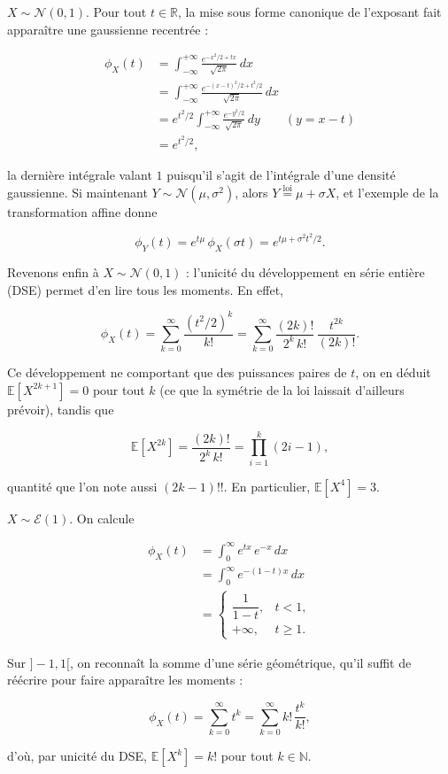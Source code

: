 \begin{exemple}
$X \sim \mathcal{N}(0, 1)$. Pour tout $t \in \mathbb{R}$, la mise sous forme canonique de l'exposant fait apparaître une gaussienne recentrée :

\begin{align*}
\phi_X(t) &= \int_{-\infty}^{+\infty} \frac{e^{-x^2/2 + tx}}{\sqrt{2\pi}}\, dx \\
&= \int_{-\infty}^{+\infty} \frac{e^{-(x - t)^2/2 + t^2/2}}{\sqrt{2\pi}}\, dx \\
&= e^{t^2/2} \int_{-\infty}^{+\infty} \frac{e^{-y^2/2}}{\sqrt{2\pi}}\, dy \qquad (y = x - t) \\
&= e^{t^2/2},
\end{align*}

la dernière intégrale valant $1$ puisqu'il s'agit de l'intégrale d'une densité gaussienne. Si maintenant $Y \sim \mathcal{N}(\mu, \sigma^2)$, alors $Y \overset{\text{loi}}{=} \mu + \sigma X$, et l'exemple de la transformation affine donne

$$
\phi_Y(t) = e^{t\mu}\, \phi_X(\sigma t) = e^{t\mu + \sigma^2 t^2/2}.
$$

Revenons enfin à $X \sim \mathcal{N}(0, 1)$ : l'unicité du développement en série entière (DSE) permet d'en lire tous les moments. En effet,

$$
\phi_X(t) = \sum_{k=0}^\infty \frac{(t^2/2)^k}{k!} = \sum_{k=0}^\infty \frac{(2k)!}{2^k\, k!}\, \frac{t^{2k}}{(2k)!}.
$$

Ce développement ne comportant que des puissances paires de $t$, on en déduit $\mathbb{E}[X^{2k+1}] = 0$ pour tout $k$ (ce que la symétrie de la loi laissait d'ailleurs prévoir), tandis que

$$
\mathbb{E}[X^{2k}] = \frac{(2k)!}{2^k\, k!} = \prod_{i=1}^k (2i - 1),
$$

quantité que l'on note aussi $(2k - 1)!!$. En particulier, $\mathbb{E}[X^4] = 3$.
\end{exemple}

\begin{exemple}
$X \sim \mathcal{E}(1)$. On calcule

\begin{align*}
\phi_X(t) &= \int_0^\infty e^{tx}\, e^{-x}\, dx \\
&= \int_0^\infty e^{-(1 - t)x}\, dx \\
&= \begin{cases} \dfrac{1}{1 - t}, & t < 1, \\[6pt] +\infty, & t \geq 1. \end{cases}
\end{align*}

Sur $]-1, 1[$, on reconnaît la somme d'une série géométrique, qu'il suffit de réécrire pour faire apparaître les moments :

$$
\phi_X(t) = \sum_{k=0}^\infty t^k = \sum_{k=0}^\infty k!\, \frac{t^k}{k!},
$$

d'où, par unicité du DSE, $\mathbb{E}[X^k] = k!$ pour tout $k \in \mathbb{N}$.
\end{exemple}

